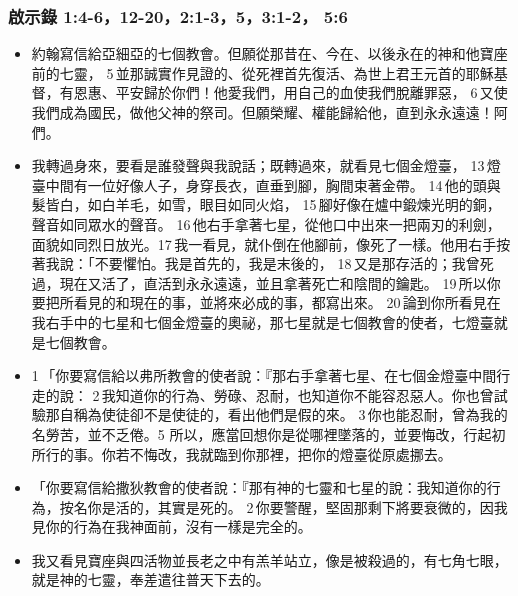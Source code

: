 \subsubsection{啟示錄 1:4-6，12-20，2:1-3，5，3:1-2， 5:6}
\begin{itemize} 
\itemsep-.25em
\item 約翰寫信給亞細亞的七個教會。但願從那昔在、今在、以後永在的神和他寶座前的七靈， 5 並那誠實作見證的、從死裡首先復活、為世上君王元首的耶穌基督，有恩惠、平安歸於你們！他愛我們，用自己的血使我們脫離罪惡， 6 又使我們成為國民，做他父神的祭司。但願榮耀、權能歸給他，直到永永遠遠！阿們。
\item 我轉過身來，要看是誰發聲與我說話；既轉過來，就看見七個金燈臺， 13 燈臺中間有一位好像人子，身穿長衣，直垂到腳，胸間束著金帶。 14 他的頭與髮皆白，如白羊毛，如雪，眼目如同火焰， 15 腳好像在爐中鍛煉光明的銅，聲音如同眾水的聲音。 16 他右手拿著七星，從他口中出來一把兩刃的利劍，面貌如同烈日放光。17 我一看見，就仆倒在他腳前，像死了一樣。他用右手按著我說：「不要懼怕。我是首先的，我是末後的， 18 又是那存活的；我曾死過，現在又活了，直活到永永遠遠，並且拿著死亡和陰間的鑰匙。 19 所以你要把所看見的和現在的事，並將來必成的事，都寫出來。 20 論到你所看見在我右手中的七星和七個金燈臺的奧祕，那七星就是七個教會的使者，七燈臺就是七個教會。
\item 1 「你要寫信給以弗所教會的使者說：『那右手拿著七星、在七個金燈臺中間行走的說： 2 我知道你的行為、勞碌、忍耐，也知道你不能容忍惡人。你也曾試驗那自稱為使徒卻不是使徒的，看出他們是假的來。 3 你也能忍耐，曾為我的名勞苦，並不乏倦。5 所以，應當回想你是從哪裡墜落的，並要悔改，行起初所行的事。你若不悔改，我就臨到你那裡，把你的燈臺從原處挪去。
\item 「你要寫信給撒狄教會的使者說：『那有神的七靈和七星的說：我知道你的行為，按名你是活的，其實是死的。 2 你要警醒，堅固那剩下將要衰微的，因我見你的行為在我神面前，沒有一樣是完全的。
\item 我又看見寶座與四活物並長老之中有羔羊站立，像是被殺過的，有七角七眼，就是神的七靈，奉差遣往普天下去的。
\end{itemize} 


















